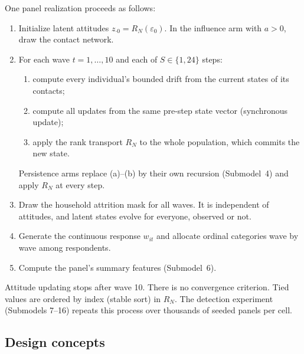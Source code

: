 One panel realization proceeds as follows:
\begin{enumerate}
\item Initialize latent attitudes $z_{\cdot0}=R_N(\varepsilon_0)$. In the influence arm with $a>0$, draw the contact network.
\item For each wave $t=1,\ldots,10$ and each of $S\in\{1,24\}$ steps:
  \begin{enumerate}
  \item compute every individual's bounded drift from the current states of its contacts;
  \item compute all updates from the same pre-step state vector (synchronous update);
  \item apply the rank transport $R_N$ to the whole population, which commits the new state.
  \end{enumerate}
  Persistence arms replace (a)--(b) by their own recursion (Submodel~4) and apply $R_N$ at every step.
\item Draw the household attrition mask for all waves. It is independent of attitudes, and latent states evolve for everyone, observed or not.
\item Generate the continuous response $w_{it}$ and allocate ordinal categories wave by wave among respondents.
\item Compute the panel's summary features (Submodel~6).
\end{enumerate}
Attitude updating stops after wave 10. There is no convergence criterion. Tied values are ordered by index (stable sort) in $R_N$. The detection experiment (Submodels 7--16) repeats this process over thousands of seeded panels per cell.

\subsection{Design concepts}

